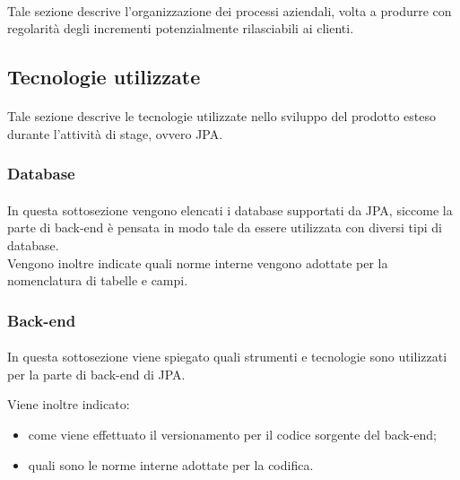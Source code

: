 \documentclass[
article,
10pt, %
oneside, %
BCOR5mm, %
]{scrartcl}
\begin{document}
\paragraph{} Tale sezione descrive l'organizzazione dei processi aziendali,
volta a produrre con regolarità degli incrementi potenzialmente rilasciabili ai
clienti.

\subsection{Tecnologie utilizzate}

\paragraph{} Tale sezione descrive le tecnologie utilizzate nello sviluppo del
prodotto esteso durante l'attività di stage, ovvero JPA.

\subsubsection{Database}

\paragraph{} In questa sottosezione vengono elencati i database supportati da
JPA, siccome la parte di back-end è pensata in modo tale da essere utilizzata
con diversi tipi di database. \\
Vengono inoltre indicate quali norme interne vengono adottate per la
nomenclatura di tabelle e campi.

\subsubsection{Back-end}

\paragraph{} In questa sottosezione viene spiegato quali strumenti e
tecnologie sono utilizzati per la parte di back-end di JPA.

Viene inoltre indicato:

\begin{itemize}
\item come viene effettuato il versionamento per il codice sorgente del
  back-end;
\item quali sono le norme interne adottate per la codifica.
\end{itemize}
\end{document}
